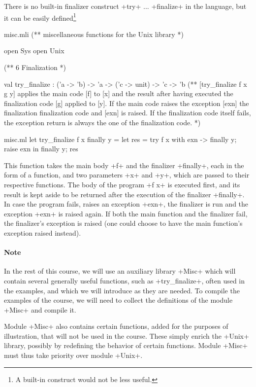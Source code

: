 There is no built-in finalizer construct \ml+try+ ... \ml+finalize+ in
the {\ocaml} language, but it can be easily defined\footnote{A
  built-in construct would not be less useful.}
\begin{codefile}{misc.mli}
(** miscellaneous functions for the Unix library *)

open Sys
open Unix

(** {6 Finalization} *)

val try_finalize : ('a -> 'b) -> 'a -> ('c -> unit) -> 'c -> 'b
(** [try_finalize f x g y] applies the main code [f] to [x] and
    the result after having executed the finalization 
   code [g] applied to [y]. If the main code raises the exception
   [exn] the finalization finalization code and [exn] is raised.
   If the finalization code itself fails, the exception
   return is always the one of the finalization code. *)
\end{codefile}
%
\begin{listingcodefile}{misc.ml}
let try_finalize f x finally y =
  let res = try f x with exn -> finally y; raise exn in 
  finally y; 
  res
\end{listingcodefile}
%
This function takes the main body \ml+f+ and the finalizer
\ml+finally+, each in the form of a function, and two parameters \ml+x+
and \ml+y+, which are passed to their respective functions. The body
of the program \ml+f x+ is executed first, and its result is kept
aside to be returned after the execution of the finalizer 
\ml+finally+. In case the program fails, \ie{} raises an exception \ml+exn+,
the finalizer is run and the exception \ml+exn+ is raised
again. If both the main function and the finalizer fail, the
finalizer's exception is raised (one could choose to have the main
function's exception raised instead).

\paragraph{Note}

In the rest of this course, we will use an auxiliary library \ml+Misc+
which will contain several generally useful functions, such as
\ml+try_finalize+, often used in the examples, and which we will
introduce as they are needed. To compile the examples of the course, we will
need to collect the definitions of the module \ml+Misc+ and
compile it.

Module \ml+Misc+ also contains certain functions, added for the
purposes of illustration, that will not be used in the course. These
simply enrich the \ml+Unix+ library, possibly by redefining the
behavior of certain functions.  Module \ml+Misc+ must thus take
priority over module \ml+Unix+.

